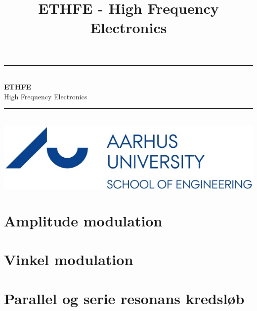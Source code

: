 \documentclass[12pt,a4paper,danish]{book}
\title{ETHFE - High Frequency Electronics}
\newcommand{\HRule}{\rule{\linewidth}{0.5mm}}
\begin{document}
\begin{titlepage}
	\clearpage\thispagestyle{empty}

	\begin{center}
		\HRule \\[0.4cm]
		{\huge \bfseries ETHFE} \\[.3cm] {\huge High Frequency Electronics}\\[0cm]
		\HRule \\[3.4cm]
		\includegraphics[width=0.5\linewidth]{graphics/au}
	\end{center}
	\renewcommand{\contentsname}{Indholdsfortegnelse}
	\tableofcontents

\end{titlepage}

 

\chapter{Amplitude modulation}


\chapter{Vinkel modulation}


\chapter{Parallel og serie resonans kredsløb}

\end{document}
